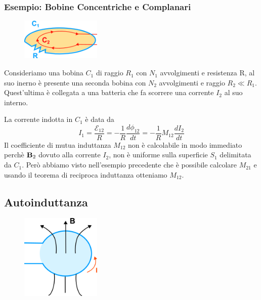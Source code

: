 \subsubsection{Esempio: Bobine Concentriche e Complanari}


\begin{figure} %
    \centering
    \includegraphics[width=0.34\textwidth]{images/bobine} %
\end{figure}
Consideriamo una bobina $C_1$ di raggio $R_1$ con $N_1$ avvolgimenti e resistenza R, al suo inerno \`e presente una seconda bobina con $N_2$ avvolgimenti e raggio $R_2 \ll R_1$. Quest'ultima \`e collegata a una batteria che fa scorrere una corrente $I_2$ al suo interno.
\newline

La corrente indotta in $C_1$ \`e data da 
\begin{equation*}
	I_1 = \frac{\mathcal{E}_{12}}{R} = - \frac{1}{R} \frac{d\phi_{12}}{dt} = -\frac{1}{R}M_{12} \frac{dI_2}{dt}
\end{equation*}
Il coefficiente di mutua induttanza $M_{12}$ non \`e calcolabile in modo immediato perch\`e $\bold{B}_2$ dovuto alla corrente $I_2$, non \`e uniforme sulla superficie $S_1$ delimitata da $C_1$. Per\`o abbiamo visto nell'esempio precedente che \`e possibile calcolare $M_{21}$ e usando il teorema di reciproca induttanza otteniamo $M_{12}$.
\newpage
\subsection{Autoinduttanza}

\begin{figure} %
    \centering
    \includegraphics[width=0.34\textwidth]{images/autoinductance} %
\end{figure}

